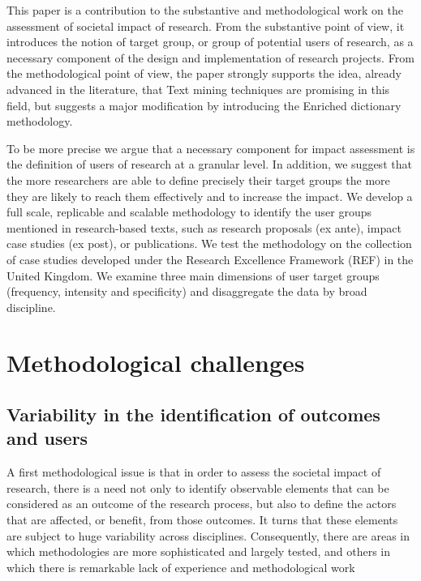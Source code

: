 \documentclass[]{book}
\begin{document}
This paper is a contribution to the substantive and methodological work
on the assessment of societal impact of research. From the substantive
point of view, it introduces the notion of target group, or group of
potential users of research, as a necessary component of the design and
implementation of research projects. From the methodological point of
view, the paper strongly supports the idea, already advanced in the
literature, that Text mining techniques are promising in this field, but
suggests a major modification by introducing the Enriched dictionary
methodology.

To be more precise we argue that a necessary component for impact
assessment is the definition of users of research at a granular level.
In addition, we suggest that the more researchers are able to define
precisely their target groups the more they are likely to reach them
effectively and to increase the impact. We develop a full scale,
replicable and scalable methodology to identify the user groups
mentioned in research-based texts, such as research proposals (ex ante),
impact case studies (ex post), or publications. We test the methodology
on the collection of case studies developed under the Research
Excellence Framework (REF) in the United Kingdom. We examine three main
dimensions of user target groups (frequency, intensity and specificity)
and disaggregate the data by broad discipline.

\section{Methodological challenges}\label{methodological-challenges}

\subsection{Variability in the identification of outcomes and
users}\label{variability-in-the-identification-of-outcomes-and-users}

A first methodological issue is that in order to assess the societal
impact of research, there is a need not only to identify observable
elements that can be considered as an outcome of the research process,
but also to define the actors that are affected, or benefit, from those
outcomes. It turns that these elements are subject to huge variability
across disciplines. Consequently, there are areas in which methodologies
are more sophisticated and largely tested, and others in which there is
remarkable lack of experience and methodological work
\citep[\citet{cturcan2015national}]{stern2013long, mitton2007knowledge}
\end{document}
